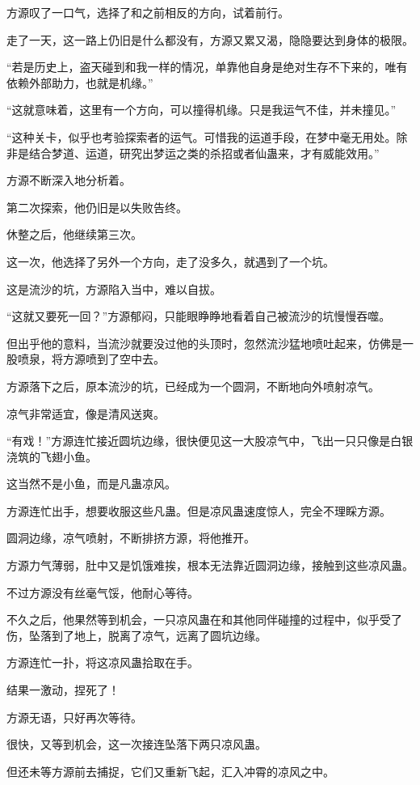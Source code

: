 \begin{this_body}
方源叹了一口气，选择了和之前相反的方向，试着前行。

走了一天，这一路上仍旧是什么都没有，方源又累又渴，隐隐要达到身体的极限。

“若是历史上，盗天碰到和我一样的情况，单靠他自身是绝对生存不下来的，唯有依赖外部助力，也就是机缘。”

“这就意味着，这里有一个方向，可以撞得机缘。只是我运气不佳，并未撞见。”

“这种关卡，似乎也考验探索者的运气。可惜我的运道手段，在梦中毫无用处。除非是结合梦道、运道，研究出梦运之类的杀招或者仙蛊来，才有威能效用。”

方源不断深入地分析着。

第二次探索，他仍旧是以失败告终。

休整之后，他继续第三次。

这一次，他选择了另外一个方向，走了没多久，就遇到了一个坑。

这是流沙的坑，方源陷入当中，难以自拔。

“这就又要死一回？”方源郁闷，只能眼睁睁地看着自己被流沙的坑慢慢吞噬。

但出乎他的意料，当流沙就要没过他的头顶时，忽然流沙猛地喷吐起来，仿佛是一股喷泉，将方源喷到了空中去。

方源落下之后，原本流沙的坑，已经成为一个圆洞，不断地向外喷射凉气。

凉气非常适宜，像是清风送爽。

“有戏！”方源连忙接近圆坑边缘，很快便见这一大股凉气中，飞出一只只像是白银浇筑的飞翅小鱼。

这当然不是小鱼，而是凡蛊凉风。

方源连忙出手，想要收服这些凡蛊。但是凉风蛊速度惊人，完全不理睬方源。

圆洞边缘，凉气喷射，不断排挤方源，将他推开。

方源力气薄弱，肚中又是饥饿难挨，根本无法靠近圆洞边缘，接触到这些凉风蛊。

不过方源没有丝毫气馁，他耐心等待。

不久之后，他果然等到机会，一只凉风蛊在和其他同伴碰撞的过程中，似乎受了伤，坠落到了地上，脱离了凉气，远离了圆坑边缘。

方源连忙一扑，将这凉风蛊拾取在手。

结果一激动，捏死了！

方源无语，只好再次等待。

很快，又等到机会，这一次接连坠落下两只凉风蛊。

但还未等方源前去捕捉，它们又重新飞起，汇入冲霄的凉风之中。


\end{this_body}
